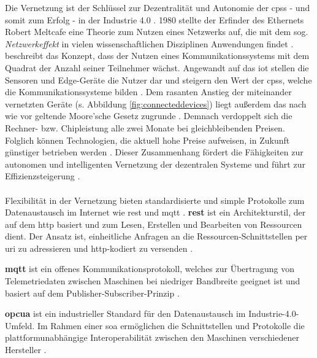 Die Vernetzung ist der Schlüssel zur Dezentralität und Autonomie der \ac{cpss} - und somit zum Erfolg - in der Industrie 4.0 \citep{Bauernhansl2014}. 1980 stellte der Erfinder des Ethernets Robert Meltcafe eine Theorie zum Nutzen eines Netzwerks auf, die mit dem sog. \textit{Netzwerkeffekt} in vielen wissenschaftlichen Disziplinen Anwendungen findet \citep{Lea2018}. \citet[S. 18]{Bauernhansl2014} beschreibt das Konzept, \glqq [...] dass der Nutzen eines Kommunikationssystems mit dem Quadrat der Anzahl seiner Teilnehmer wächst.\grqq{} Angewandt auf das \acf{iot} stellen die Sensoren und Edge-Geräte die Nutzer dar und steigern den Wert der \ac{cpss}, welche die Kommunikationssysteme bilden \citep{Lea2018}. Dem rasanten Anstieg der  miteinander vernetzten Geräte (s. Abbildung \ref{fig:connecteddevices}) liegt außerdem das nach wie vor geltende Moore'sche Gesetz zugrunde \citep{Barthelmaes2017}. Demnach verdoppelt sich die Rechner- bzw. Chipleistung alle zwei Monate bei gleichbleibenden Preisen. Folglich können Technologien, die aktuell hohe Preise aufweisen, in Zukunft günstiger betrieben werden \citep{Bauernhansl2014}. Dieser Zusammenhang fördert die Fähigkeiten zur autonomen und intelligenten Vernetzung der dezentralen Systeme und führt zur Effizienzsteigerung \citep{Barthelmaes2017}.
\\\\
Flexibilität in der Vernetzung bieten standardisierte und simple Protokolle zum Datenaustausch im Internet wie \ac{rest} und \ac{mqtt}  \citep{Hnisch2017}.
\textbf{\ac{rest}} ist ein Architekturstil, der auf dem \ac{http} basiert und zum Lesen, Erstellen und Bearbeiten von Ressourcen dient. Der Ansatz ist, einheitliche Anfragen an die Ressourcen-Schnittstellen per \ac{uri} zu adressieren und \ac{http}-kodiert zu versenden \citep{Sendler2016}.

\textbf{\ac{mqtt}} ist ein offenes Kommunikationsprotokoll, welches zur Übertragung von Telemetriedaten zwischen Maschinen bei niedriger Bandbreite geeignet ist und basiert auf dem Publisher-Subscriber-Prinzip \citep{Lea2018}.

\textbf{\ac{opcua}} ist ein industrieller Standard für den Datenaustausch im Industrie-4.0-Umfeld. Im Rahmen einer \ac{soa} ermöglichen die Schnittstellen und Protokolle die plattformunabhängige Interoperabilität zwischen den Maschinen verschiedener Hersteller \citep{Bauernhansl2014}. 